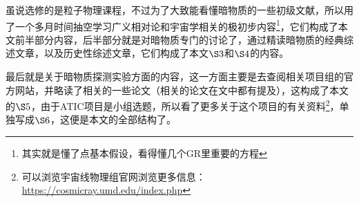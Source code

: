 \documentclass{ctexart}
\begin{document}
	虽说选修的是粒子物理课程，不过为了大致能看懂暗物质的一些初级文献，所以用了一个多月时间抽空学习广义相对论和宇宙学相关的极初步内容\footnote{其实就是懂了点基本假设，看得懂几个GR里重要的方程}，它们构成了本文前半部分内容，后半部分就是对暗物质专门的讨论了，通过精读暗物质的经典综述文章\cite{RN32}，以及历史性综述文章\cite{RevModPhys.90.045002}，它们构成了本文$\S3$和$\S4$的内容。
	
	最后就是关于暗物质探测实验方面的内容，这一方面主要是去查阅相关项目组的官方网站，并略读了相关的一些论文（相关的论文在文中都有提及），这构成了本文的$\S 5$，由于ATIC项目是小组选题，所以看了更多关于这个项目的有关资料\footnote{可以浏览宇宙线物理组官网浏览更多信息：\url{https://cosmicray.umd.edu/index.php}}，单独写成$\S 6$，这便是本文的全部结构了。
	
	
	
	\nocite{*}
	\clearpage 
	
\end{document}
